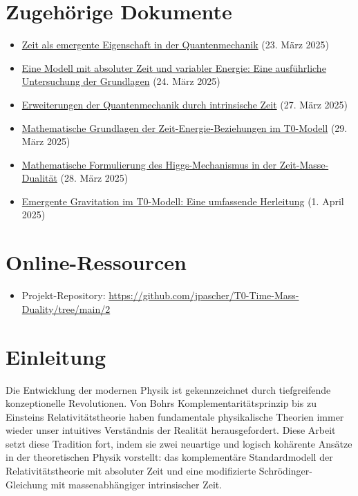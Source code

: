 \documentclass[a4paper,12pt]{article}
\begin{document}
	\section*{Zugehörige Dokumente}
	\begin{itemize}
		\item \href{https://github.com/jpascher/T0-Time-Mass-Duality/tree/main/2/pdf/Deutsch/ZeitEmergentQM.pdf}{Zeit als emergente Eigenschaft in der Quantenmechanik} (23. März 2025)
		\item \href{https://github.com/jpascher/T0-Time-Mass-Duality/tree/main/2/pdf/Deutsch/ZeitMasseNeuerBlick.pdf}{Eine Modell mit absoluter Zeit und variabler Energie: Eine ausführliche Untersuchung der Grundlagen} (24. März 2025)
		\item \href{https://github.com/jpascher/T0-Time-Mass-Duality/tree/main/2/pdf/Deutsch/NotwendigkeitQMErweiterung.pdf}{Erweiterungen der Quantenmechanik durch intrinsische Zeit} (27. März 2025)
		\item \href{https://github.com/jpascher/T0-Time-Mass-Duality/tree/main/2/pdf/Deutsch/MathZeitMasseLagrange.pdf}{Mathematische Grundlagen der Zeit-Energie-Beziehungen im T0-Modell} (29. März 2025)
		\item \href{https://github.com/jpascher/T0-Time-Mass-Duality/tree/main/2/pdf/Deutsch/MathHiggsZeitMasse.pdf}{Mathematische Formulierung des Higgs-Mechanismus in der Zeit-Masse-Dualität} (28. März 2025)
		\item \href{https://github.com/jpascher/T0-Time-Mass-Duality/tree/main/2/pdf/Deutsch/EmergentGravT0.pdf}{Emergente Gravitation im T0-Modell: Eine umfassende Herleitung} (1. April 2025)
	\end{itemize}
	
	\section*{Online-Ressourcen}
	\begin{itemize}
		\item Projekt-Repository: \url{https://github.com/jpascher/T0-Time-Mass-Duality/tree/main/2}
	\end{itemize}
	\newpage
	
	\section{Einleitung}
	
	Die Entwicklung der modernen Physik ist gekennzeichnet durch tiefgreifende konzeptionelle Revolutionen. Von Bohrs Komplementaritätsprinzip \cite{Bohr1928} bis zu Einsteins Relativitätstheorie \cite{Einstein1905} haben fundamentale physikalische Theorien immer wieder unser intuitives Verständnis der Realität herausgefordert. Diese Arbeit setzt diese Tradition fort, indem sie zwei neuartige und logisch kohärente Ansätze in der theoretischen Physik vorstellt: das komplementäre Standardmodell der Relativitätstheorie mit absoluter Zeit und eine modifizierte Schrödinger-Gleichung mit massenabhängiger intrinsischer Zeit.
	
\end{document}
